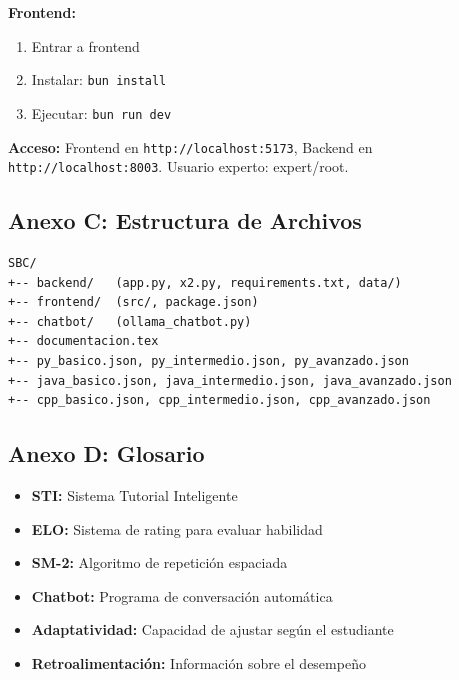 \documentclass[12pt,letterpaper]{article}
\begin{document}
\textbf{Frontend:}
\begin{enumerate}
\item Entrar a frontend
\item Instalar: \texttt{bun install}
\item Ejecutar: \texttt{bun run dev}
\end{enumerate}

\textbf{Acceso:} Frontend en \texttt{http://localhost:5173}, Backend en \texttt{http://localhost:8003}. Usuario experto: expert/root.

\subsection{Anexo C: Estructura de Archivos}

\begin{verbatim}
SBC/
+-- backend/   (app.py, x2.py, requirements.txt, data/)
+-- frontend/  (src/, package.json)
+-- chatbot/   (ollama_chatbot.py)
+-- documentacion.tex
+-- py_basico.json, py_intermedio.json, py_avanzado.json
+-- java_basico.json, java_intermedio.json, java_avanzado.json
+-- cpp_basico.json, cpp_intermedio.json, cpp_avanzado.json
\end{verbatim}

\subsection{Anexo D: Glosario}

\begin{itemize}
\item \textbf{STI:} Sistema Tutorial Inteligente
\item \textbf{ELO:} Sistema de rating para evaluar habilidad
\item \textbf{SM-2:} Algoritmo de repetición espaciada
\item \textbf{Chatbot:} Programa de conversación automática
\item \textbf{Adaptatividad:} Capacidad de ajustar según el estudiante
\item \textbf{Retroalimentación:} Información sobre el desempeño
\end{itemize}
\end{document}
